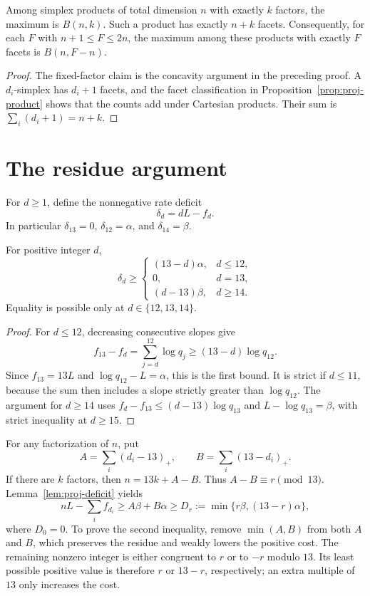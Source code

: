 \begin{corollary}
\label{cor:proj-facets-budget}
Among simplex products of total dimension $n$ with exactly $k$ factors,
the maximum is $B(n,k)$. Such a product has exactly $n+k$ facets.
Consequently, for each $F$ with $n+1\le F\le2n$, the maximum among
these products with exactly $F$ facets is $B(n,F-n)$.
\end{corollary}

\begin{proof}
The fixed-factor claim is the concavity argument in the preceding
proof. A $d_i$-simplex has $d_i+1$ facets, and the facet classification
in Proposition~\ref{prop:proj-product} shows that the counts add under
Cartesian products. Their sum is $\sum_i(d_i+1)=n+k$.
\end{proof}

\section{The residue argument}

For $d\ge1$, define the nonnegative rate deficit
\[
 \delta_d=dL-f_d.
\]
In particular $\delta_{13}=0$, $\delta_{12}=\alpha$, and
$\delta_{14}=\beta$.

\begin{lemma}
\label{lem:proj-deficit}
For positive integer $d$,
\[
 \delta_d\ge
 \begin{cases}
 (13-d)\alpha,&d\le12,\\
 0,&d=13,\\
 (d-13)\beta,&d\ge14.
 \end{cases}
\]
Equality is possible only at $d\in\{12,13,14\}$.
\end{lemma}

\begin{proof}
For $d\le12$, decreasing consecutive slopes give
\[
 f_{13}-f_d=\sum_{j=d}^{12}\log q_j
                  \ge(13-d)\log q_{12}.
\]
Since $f_{13}=13L$ and $\log q_{12}-L=\alpha$, this is the
first bound. It is strict if $d\le11$, because the sum then includes
a slope strictly greater than $\log q_{12}$. The argument for
$d\ge14$ uses
$f_d-f_{13}\le(d-13)\log q_{13}$ and
$L-\log q_{13}=\beta$, with strict inequality at $d\ge15$.
\end{proof}

For any factorization of $n$, put
\[
 A=\sum_i(d_i-13)_+,
 \qquad B=\sum_i(13-d_i)_+.
\]
If there are $k$ factors, then $n=13k+A-B$. Thus
$A-B\equiv r\pmod {13}$. Lemma~\ref{lem:proj-deficit} yields
\begin{equation}\label{eq:proj-residue-bound}
 nL-\sum_i f_{d_i}\ge A\beta+B\alpha
       \ge D_r:=\min\{r\beta,(13-r)\alpha\},
\end{equation}
where $D_0=0$. To prove the second inequality, remove
$\min(A,B)$ from both $A$ and $B$, which preserves the residue and
weakly lowers the positive cost. The remaining nonzero integer is
either congruent to $r$ or to $-r$ modulo $13$. Its least possible
positive value is therefore $r$ or $13-r$, respectively; an extra
multiple of $13$ only increases the cost.

